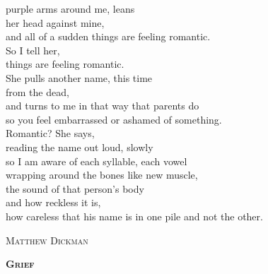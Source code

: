 \documentclass[10pt]{memoir}
\begin{document}
\begin{multicols}{2}
{purple arms around me, leans\\
her head against mine,\\
and all of a sudden things are feeling romantic.\\
So I tell her,\\
things are feeling romantic.\\
She pulls another name, this time\\
from the dead,\\
and turns to me in that way that parents do\\
so you feel embarrassed or ashamed of something.\\
Romantic? She says,\\
reading the name out loud, slowly\\
so I am aware of each syllable, each vowel\\
wrapping around the bones like new muscle,\\
the sound of that person's body\\
and how reckless it is,\\
how careless that his name is in one pile and not the other.
}

\vspace{11pt}
\hspace{44pt} \textsc{Matthew Dickman}\\

\vfill


\textbf{\textsc{\Large Grief}}
\vspace{18pt}


\end{multicols}
\end{document}

